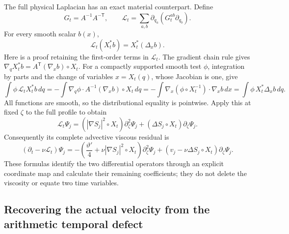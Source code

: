 The full physical Laplacian has an exact material counterpart. Define
\[
 G_t=A^{-1}A^{-\mathsf T},\qquad
 \mathcal L_t=\sum_{a,b}\partial_{q_a}
                         (G_t^{ab}\partial_{q_b}).
\]
For every smooth scalar $b(x)$,
\begin{equation}
 \mathcal L_t(X_t^*b)=X_t^*(\Delta_xb).
 \label{naf:laplace}
\end{equation}
Here is a proof retaining the first-order terms in $\mathcal L_t$.
The gradient chain rule gives $\nabla_qX_t^*b=A^{\mathsf T}
(\nabla_xb)\circ X_t$. For a compactly supported smooth test $\phi$,
integration by parts and the change of variables $x=X_t(q)$, whose
Jacobian is one, give
\[
 \int\phi\,\mathcal L_tX_t^*b\,dq
 =-\int\nabla_q\phi\cdot A^{-1}(\nabla_xb)\circ X_t\,dq
 =-\int\nabla_x(\phi\circ X_t^{-1})\cdot\nabla_xb\,dx
 =\int\phi\,X_t^*\Delta_xb\,dq.
\]
All functions are smooth, so the distributional equality is pointwise.
Apply this at fixed $\zeta$ to the full profile to obtain
\begin{equation}
 \mathcal L_t\Psi_j=(|\nabla S_j|^2\circ X_t)\partial_\zeta^2\Psi_j
                      +(\Delta S_j\circ X_t)\partial_\zeta\Psi_j.
 \label{naf:profilelaplace}
\end{equation}
Consequently its complete advective viscous residual is
\[
 (\partial_t-\nu\mathcal L_t)\Psi_j
 =-\left(\frac{\vartheta'}4+\nu|\nabla S_j|^2\circ X_t\right)
                                  \partial_\zeta^2\Psi_j
   +(v_j-\nu\Delta S_j\circ X_t)\partial_\zeta\Psi_j.
\]
These formulas identify the two differential operators through an
explicit coordinate map and calculate their remaining coefficients;
they do not delete the viscosity or equate two time variables.

\subsection{Recovering the actual velocity from the arithmetic temporal defect}

